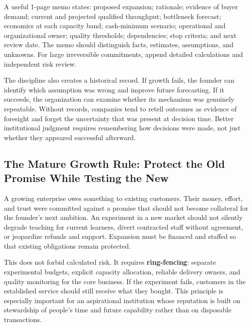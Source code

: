 A useful 1-page memo states: proposed expansion; rationale; evidence of buyer demand; current and projected qualified throughput; bottleneck forecast; economics at each capacity band; cash-minimum scenario; operational and organizational owner; quality thresholds; dependencies; stop criteria; and next review date. The memo should distinguish facts, estimates, assumptions, and unknowns. For large irreversible commitments, append detailed calculations and independent risk review.

The discipline also creates a historical record. If growth fails, the founder can identify which assumption was wrong and improve future forecasting. If it succeeds, the organization can examine whether its mechanism was genuinely repeatable. Without records, companies tend to retell outcomes as evidence of foresight and forget the uncertainty that was present at decision time. Better institutional judgment requires remembering how decisions were made, not just whether they appeared successful afterward.

\subsection{The Mature Growth Rule: Protect the Old Promise While Testing the New}
\label{sec:protect_old_promise_while_testing_new}

A growing enterprise owes something to existing customers. Their money, effort, and trust were committed against a promise that should not become collateral for the founder's next ambition. An experiment in a new market should not silently degrade teaching for current learners, divert contracted staff without agreement, or jeopardize refunds and support. Expansion must be financed and staffed so that existing obligations remain protected.

This does not forbid calculated risk. It requires \textbf{ring-fencing}: separate experimental budgets, explicit capacity allocation, reliable delivery owners, and quality monitoring for the core business. If the experiment fails, customers in the established service should still receive what they bought. This principle is especially important for an aspirational institution whose reputation is built on stewardship of people's time and future capability rather than on disposable transactions.
